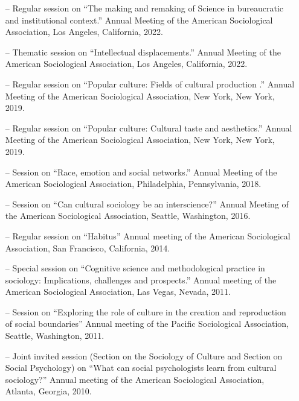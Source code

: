 
\begin{itemize}[itemsep=-0.5ex]
    \item[--] Regular session on ``The making and remaking of Science in bureaucratic and institutional context.'' Annual Meeting of the American Sociological Association, Los Angeles, California, 2022.
    
    \item[--] Thematic session on ``Intellectual displacements.'' Annual Meeting of the American Sociological Association, Los Angeles, California, 2022.
    
    \item[--] Regular session on ``Popular culture: Fields of cultural production .'' Annual Meeting of the American Sociological Association, New York, New York, 2019.
    
    \item[--] Regular session on ``Popular culture: Cultural taste and aesthetics.'' Annual Meeting of the American Sociological Association, New York, New York, 2019.
    
    \item[--] Session on ``Race, emotion and social networks.'' Annual Meeting of the American Sociological Association, Philadelphia, Pennsylvania, 2018.
    
    \item[--] Session on  ``Can cultural sociology be an interscience?'' Annual Meeting of the American Sociological Association, Seattle, Washington, 2016.
    
    \item[--] Regular session on ``Habitus''   Annual meeting of the American Sociological Association, San Francisco, California, 2014.
    
    \item[--] Special session on ``Cognitive science and methodological practice in sociology: Implications, challenges and prospects.''  Annual meeting of the American Sociological Association, Las Vegas, Nevada, 2011.
    
    \item[--] Session on ``Exploring the role of culture in the creation and reproduction of social boundaries''   Annual meeting of the Pacific Sociological Association, Seattle, Washington, 2011.
    
    \item[--] Joint invited session (Section on the Sociology of Culture and Section on Social Psychology) on ``What can social psychologists learn from cultural sociology?''   Annual meeting of the American Sociological Association, Atlanta, Georgia, 2010.
    

\end{itemize}
